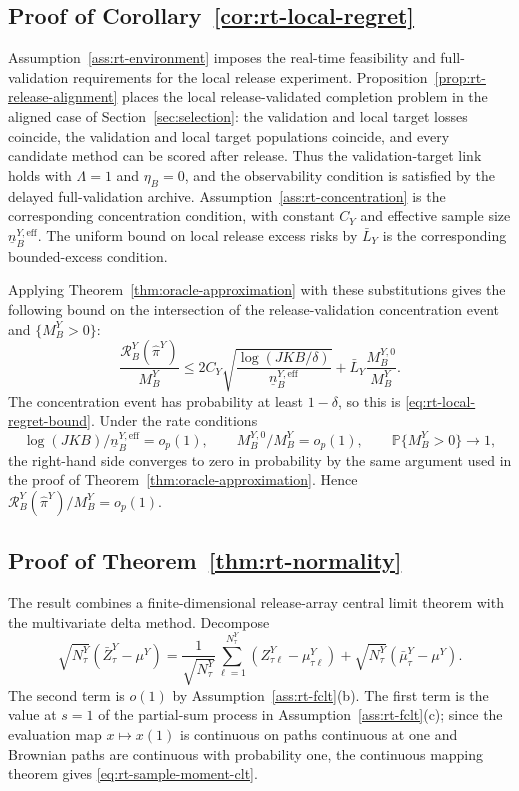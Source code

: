 \documentclass[a4paper, 12pt]{article}
\theoremstyle{plain}
\theoremstyle{remark}
\newcommand{\Prb}{\mathbb{P}}
\newcommand{\1}{\mathbf{1}}
\begin{document}
\subsection*{Proof of Corollary~\ref{cor:rt-local-regret}}
Assumption~\ref{ass:rt-environment} imposes the real-time feasibility and full-validation requirements for the local release experiment. Proposition~\ref{prop:rt-release-alignment} places the local release-validated completion problem in the aligned case of Section~\ref{sec:selection}: the validation and local target losses coincide, the validation and local target populations coincide, and every candidate method can be scored after release. Thus the validation-target link holds with \(\Lambda=1\) and \(\eta_B=0\), and the observability condition is satisfied by the delayed full-validation archive. Assumption~\ref{ass:rt-concentration} is the corresponding concentration condition, with constant \(C_Y\) and effective sample size \(\underline n^{Y,\mathrm{eff}}_B\). The uniform bound on local release excess risks by \(\bar L_Y\) is the corresponding bounded-excess condition.

Applying Theorem~\ref{thm:oracle-approximation} with these substitutions gives the following bound on the intersection of the release-validation concentration event and \(\{M^Y_B>0\}\):
\begin{equation*}
    \frac{\mathcal R^Y_B(\widehat\pi^Y)}{M^Y_B}
    \leq
    2C_Y
    \sqrt{\frac{\log(JKB/\delta)}{\underline n^{Y,\mathrm{eff}}_B}}
    +
    \bar L_Y\frac{M^{Y,0}_B}{M^Y_B}.
\end{equation*}
The concentration event has probability at least \(1-\delta\), so this is \eqref{eq:rt-local-regret-bound}. Under the rate conditions
\[
\log(JKB)/\underline n^{Y,\mathrm{eff}}_B=o_p(1),\qquad
M^{Y,0}_B/M^Y_B=o_p(1),\qquad
\Prb\{M^Y_B>0\}\to1,
\]
the right-hand side converges to zero in probability by the same argument used in the proof of Theorem~\ref{thm:oracle-approximation}. Hence \(\mathcal R^Y_B(\widehat\pi^Y)/M^Y_B=o_p(1)\).

\subsection*{Proof of Theorem~\ref{thm:rt-normality}}
The result combines a finite-dimensional release-array central limit theorem with the multivariate delta method. Decompose
\begin{equation*}
    \sqrt{N^Y_\tau}(\bar Z^Y_\tau-\mu^Y)
    =
    \frac{1}{\sqrt{N^Y_\tau}}\sum_{\ell=1}^{N^Y_\tau}(Z^Y_{\tau\ell}-\mu^Y_{\tau\ell})
    +
    \sqrt{N^Y_\tau}(\bar\mu^Y_\tau-\mu^Y).
\end{equation*}
The second term is \(o(1)\) by Assumption~\ref{ass:rt-fclt}(b). The first term is the value at \(s=1\) of the partial-sum process in Assumption~\ref{ass:rt-fclt}(c); since the evaluation map \(x\mapsto x(1)\) is continuous on paths continuous at one and Brownian paths are continuous with probability one, the continuous mapping theorem gives \eqref{eq:rt-sample-moment-clt}.
\end{document}
